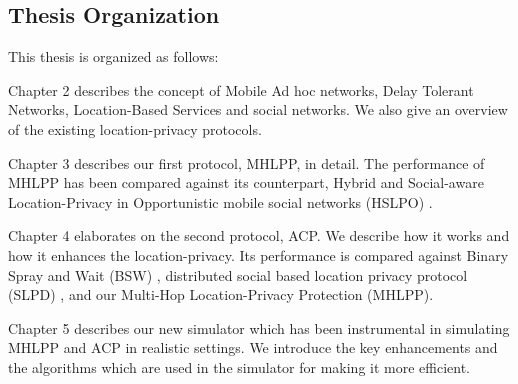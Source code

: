 \subsection{ Thesis Organization}

\noindent This thesis is organized as follows:

Chapter 2 describes the concept of Mobile Ad hoc networks, Delay Tolerant Networks, Location-Based Services and social networks. We also give an overview of the existing location-privacy protocols.

Chapter 3 describes our first protocol, MHLPP, in detail. The performance of MHLPP has been compared against its counterpart, Hybrid and Social-aware Location-Privacy in Opportunistic mobile social networks (HSLPO) \cite {C17}.

Chapter 4 elaborates on the second protocol, ACP. We describe how it works and how it enhances the location-privacy. Its performance is compared against Binary Spray and Wait (BSW) \cite{C31}, distributed social based location privacy protocol (SLPD) \cite{C16}, and our Multi-Hop Location-Privacy Protection (MHLPP).

Chapter 5 describes our new simulator which has been instrumental in simulating MHLPP and ACP in realistic settings. We introduce the key enhancements and the algorithms which are used in the simulator for making it more efficient.



\begin{comment}


\begin{figure}[H]
  \centering  
  \texttt{[image: figures/map2.pdf]}
  \caption{A map showing the organization of the thesis}
\end{figure}

\end{comment}
